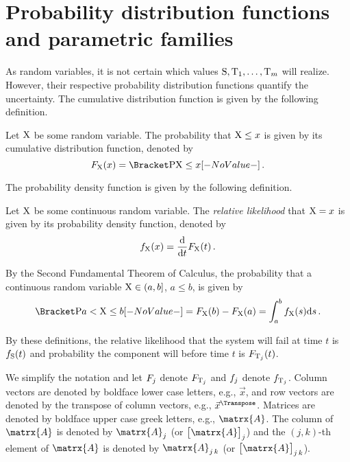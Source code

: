 \documentclass[../main.tex]{subfiles}
\begin{document}
\section{Probability distribution functions and parametric families}
As random variables, it is not certain which values $\mathrm{S},\mathrm{T}_1,\ldots,\mathrm{T}_m$ 
will realize. However, their respective probability distribution functions 
quantify the uncertainty. The cumulative distribution function is given by the 
following definition.
\begin{definition}
    \label{def:cdf_function}
    Let $\mathrm{X}$ be some random variable. The probability that $\mathrm{X} \leq x$ 
    is given by its cumulative distribution function, denoted by
    \begin{equation}
    \cdf_{\RV{X}}\!\left(x\right) = \Prob{\RV{X} \leq x}\,.
    \end{equation}
\end{definition}
The probability density function is given by the following definition.
\begin{definition}
    \label{def:pdf}
    Let $\mathrm{X}$ be some continuous random variable. The \emph{relative 
        likelihood} that $\mathrm{X} = x$ is given by its probability density 
    function, denoted by
    \begin{equation}
    f_{\mathrm{X}}(x) = \frac {\mathrm{d}}{\mathrm{d}t}F_{\mathrm{X}}(t)\,.
    \end{equation}
\end{definition}
By the Second Fundamental Theorem of Calculus, the probability that a 
continuous random variable $\mathrm{X} \in \left(a,b\right]$, $a \leq b$, is given 
by
\begin{equation}
\label{eq:prob_F_R_p}
\Prob{a < \RV{X} \leq b} = \cdf_{\RV{X}}(b) - \cdf_{\RV{X}}(a) = \int_{a}^{b} 
\pdf_{\RV{X}}(s) \mathrm{d}s\,.
\end{equation}

By these definitions, the relative likelihood that the system will fail at time 
$t$ is $f_{\mathrm{S}}(t)$ and probability the \jth component will before time $t$ is 
$F_{\mathrm{T}_j}(t)$.
\begin{notation}
We simplify the notation and let $F_j$ denote $F_{\mathrm{T}_j}$ and $f_j$ denote $f_{\mathrm{T}_j}$.
Column vectors are denoted by boldface lower case letters, e.g., $\vec{x}$, and row vectors are denoted by the transpose of column vectors, e.g., $\vec{x}^\Transpose$.
Matrices are denoted by boldface upper case greek letters, e.g., $\matrx{A}$.
The \jth column of $\matrx{A}$ is denoted by $\matrx{A}_j$ (or $\left[\matrx{A}\right]_j$) and the $(j,k)$-th element of $\matrx{A}$ is denoted by $\matrx{A}_{j\,k}$ (or $\left[\matrx{A}\right]_{j\,k}$).
\end{notation}
\end{document}
